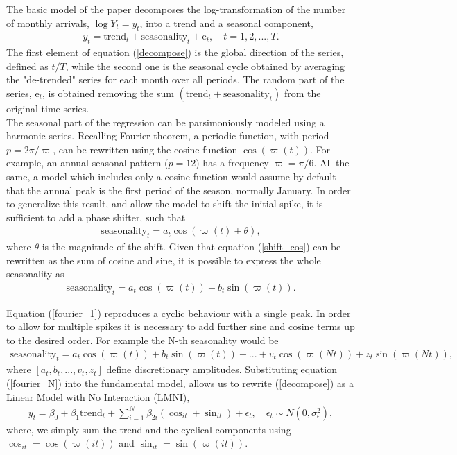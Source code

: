 \documentclass{article}\usepackage[]{graphicx}\usepackage[]{color}
\begin{document}
The basic model of the paper decomposes the log-transformation of the number of monthly arrivals, $ \log Y_{t} = y_{t} $, into a trend and a seasonal component,  
\begin{align}\label{decompose}
y_{t} = \text{trend}_{t}+\text{seasonality}_{t}+\text{e}_{t}, \quad t = 1, 2, ..., T.
\end{align}
The first element of equation (\ref{decompose}) is the global direction of the series, defined as $ t/T $, while the second one is the seasonal cycle obtained by averaging the "de-trended" series for each month over all periods. The random part of the series, $  \text{e}_{t} $, is obtained removing the sum $( \text{trend}_{t} + \text{seasonality}_{t} )$ from the original time series. \\
The seasonal part of the regression can be parsimoniously modeled using a harmonic series. Recalling Fourier theorem, a periodic function, with period $p = 2 \pi / \varpi $, can be rewritten using the cosine function $\cos(\varpi(t))$. For example, an annual seasonal pattern ($p=12$) has a frequency $\varpi= \pi / 6$. All the same, a model which includes only a cosine function would assume by default that the annual peak is the first period of the season, normally January. In order to generalize this result, and allow the model to shift the initial spike, it is sufficient to add a phase shifter, such that
\begin{align}\label{shift_cos}
\text{seasonality}_{t} = a_{t} \cos(\varpi (t)+\theta), 
\end{align}
where $ \theta $ is the magnitude of the shift. Given that equation (\ref{shift_cos}) can be rewritten as the sum of cosine and sine, it is possible to express the whole seasonality as
\begin{align}\label{fourier_1}
\text{seasonality}_{t} = a_{t} \cos(\varpi (t))+b_{t} \sin(\varpi (t)).
\end{align}

Equation (\ref{fourier_1}) reproduces a cyclic behaviour with a single peak. In order to allow for multiple spikes it is necessary to add further sine and cosine terms up to the desired order. For example the N-th seasonality would be 
\begin{align}\label{fourier_N}
\text{seasonality}_{t} = a_{t} \cos(\varpi (t)) + b_{t} \sin(\varpi (t)) + ... + v_{t} \cos(\varpi (Nt)) + z_{t} \sin(\varpi (Nt)), 
\end{align}
where $ [ a_{t},  b_{t}, ...,  v_{t},  z_{t}] $ define discretionary amplitudes. Substituting equation (\ref{fourier_N}) into the fundamental model, allows us to rewrite (\ref{decompose}) as a Linear Model with No Interaction (LMNI),
\begin{align}\label{fourier_lm_no}
y_{t}=\beta_{0}+\beta_{1}\text{trend}_{t}+\sum_{i=1}^{N}\beta_{2i}(\cos_{it}+\sin_{it})+\epsilon_{t}, \quad \epsilon_{t} \sim N(0, \sigma_{\epsilon}^2),
\end{align}
where, we simply sum the trend and the cyclical components using $\cos_{it} = \cos(\varpi (it))$ and $\sin_{it} = \sin(\varpi (it))$.
\end{document}
